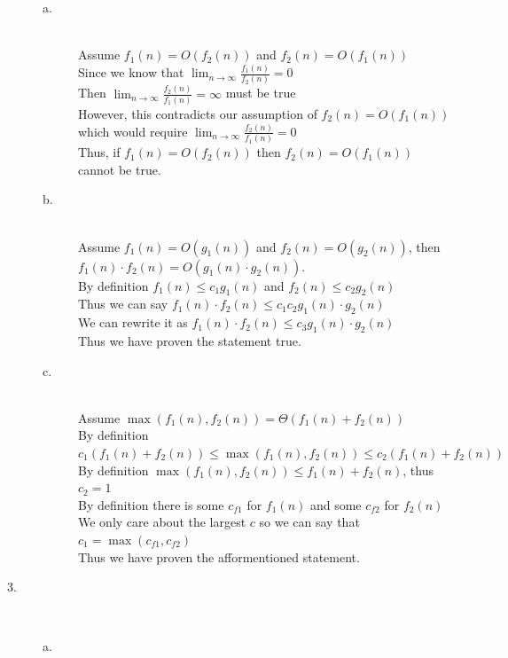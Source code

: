 \documentclass[paper=a4, fontsize=11pt]{scrartcl} %
\numberwithin{equation}{section} %
\numberwithin{figure}{section} %
\numberwithin{table}{section} %
\begin{document}
\begin{description}
        \begin{description}
        \item[a.] \hfill \\
            Assume $f_1(n) = O(f_2(n))$ and $f_2(n) = O(f_1(n))$ \\
            Since we know that $\lim_{n \to \infty} \frac{ f_1(n) }{ f_2(n) } = 0$ \\
            Then $\lim_{n \to \infty} \frac{ f_2(n) }{ f_1(n) } = \infty$ must be true \\
            However, this contradicts our assumption of $f_2(n) = O(f_1(n))$ which would require $\lim_{n \to \infty} \frac{ f_2(n) }{ f_1(n) } = 0$ \\
            Thus, if $f_1(n) = O(f_2(n))$ then $f_2(n) = O(f_1(n))$ cannot be true.
        \item[b.] \hfill \\
            Assume $f_1(n) = O(g_1(n))$ and $f_2(n) = O(g_2(n))$, then $f_1(n) \cdot f_2(n) = O(g_1(n) \cdot g_2(n))$. \\
            By definition $f_1(n) \leq c_1g_1(n)$ and $f_2(n) \leq c_2g_2(n)$ \\
            Thus we can say $f_1(n) \cdot f_2(n) \leq c_1c_2g_1(n) \cdot g_2(n)$ \\
            We can rewrite it as $f_1(n) \cdot f_2(n) \leq c_3g_1(n) \cdot g_2(n)$ \\
            Thus we have proven the statement true.
        \item[c.] \hfill \\
            Assume $\max{(f_1(n), f_2(n))} = \Theta(f_1(n) + f_2(n))$ \\
            By definition $c_1(f_1(n) + f_2(n)) \leq \max{(f_1(n), f_2(n))} \leq c_2(f_1(n) + f_2(n))$ \\
            By definition $\max{(f_1(n), f_2(n))} \leq f_1(n) + f_2(n)$, thus $c_2 = 1$ \\
            By definition there is some $c_{f1}$ for $f_1(n)$ and some $c_{f2}$ for $f_2(n)$ \\
            We only care about the largest $c$ so we can say that $c_1 = \max{(c_{f1}, c_{f2})}$ \\
            Thus we have proven the afformentioned statement.
        \end{description}
    \item[3.] \hfill \\
        \begin{description}
        \item[a.] \hfill \\

\end{description}
\end{description}
\end{document}
